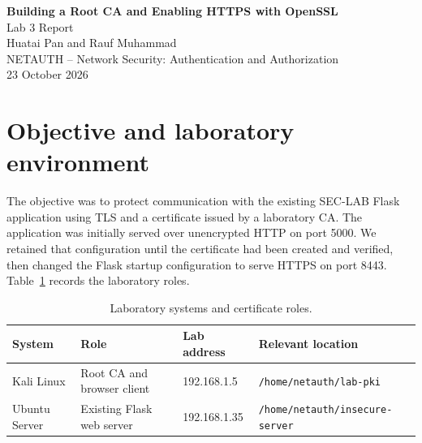 \documentclass[a4paper,11pt]{article}
\begin{document}
\begin{center}
  {\Large\bfseries Building a Root CA and Enabling HTTPS with OpenSSL}\\[0.35em]
  {\large Lab 3 Report}\\[0.6em]
  {Huatai Pan \quad and \quad Rauf Muhammad}\\[0.25em]
  {NETAUTH -- Network Security: Authentication and Authorization}\\[0.2em]
  {23 October 2026}
\end{center}

\begin{abstract}
We created an encrypted 4096-bit RSA root certification authority (CA) on Kali Linux,
generated a separate 2048-bit RSA key and certificate signing request (CSR) on an Ubuntu
Flask server, and issued a three-year TLS server certificate. We then configured the
existing web application to serve HTTPS on port 8443. OpenSSL verified the certificate
chain, a client request using the root certificate returned HTTP 200, and Firefox
accepted the connection after the laboratory root CA was imported. The server private
key remained on Ubuntu; the root CA private key remained on Kali.
\end{abstract}

\section{Objective and laboratory environment}
The objective was to protect communication with the existing SEC-LAB Flask application
using TLS and a certificate issued by a laboratory CA. The application was initially
served over unencrypted HTTP on port 5000. We retained that configuration until the
certificate had been created and verified, then changed the Flask startup configuration
to serve HTTPS on port 8443. Table~\ref{tab:topology} records the laboratory roles.

\begin{table}[H]\centering
\caption{Laboratory systems and certificate roles.}\label{tab:topology}
\begin{tabularx}{\linewidth}{@{}lXll@{}}\toprule
System & Role & Lab address & Relevant location \\ \midrule
Kali Linux & Root CA and browser client & 192.168.1.5 & \texttt{/home/netauth/lab-pki} \\
Ubuntu Server & Existing Flask web server & 192.168.1.35 & \texttt{/home/netauth/insecure-server} \\
\bottomrule\end{tabularx}
\end{table}
\end{document}
